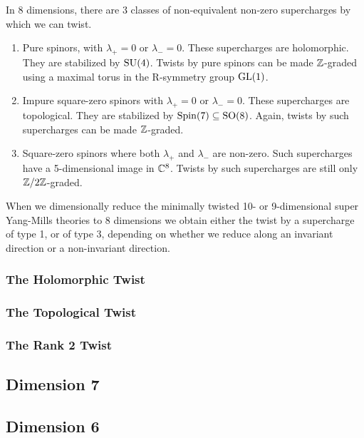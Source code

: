 \documentclass[10pt, oneside]{article}
\begin{document}
In 8 dimensions, there are 3 classes of non-equivalent non-zero supercharges by which we can twist.
\begin{enumerate}
 \item Pure spinors, with $\lambda_+ = 0$ or $\lambda_- = 0$.  These supercharges are holomorphic.  They are stabilized by $\mathrm{SU}(4)$.  Twists by pure spinors can be made $\mathbb Z$-graded using a maximal torus in the R-symmetry group $\mathrm{GL}(1)$.
 \item Impure square-zero spinors with $\lambda_+ = 0$ or $\lambda_- = 0$.  These supercharges are topological.  They are stabilized by $\mathrm{Spin}(7) \subseteq \mathrm{SO}(8)$.  Again, twists by such supercharges can be made $\mathbb Z$-graded.
 \item Square-zero spinors where both $\lambda_+$ and $\lambda_-$ are non-zero.  Such supercharges have a 5-dimensional image in $\mathbb C^8$.  Twists by such supercharges are still only $\mathbb Z/2\mathbb Z$-graded.
\end{enumerate}

When we dimensionally reduce the minimally twisted 10- or 9-dimensional super Yang-Mills theories to 8 dimensions we obtain either the twist by a supercharge of type 1, or of type 3, depending on whether we reduce along an invariant direction or a non-invariant direction. 

\subsubsection{The Holomorphic Twist}

\subsubsection{The Topological Twist}

\subsubsection{The Rank 2 Twist}



\subsection{Dimension 7}


\subsection{Dimension 6}
\end{document}
